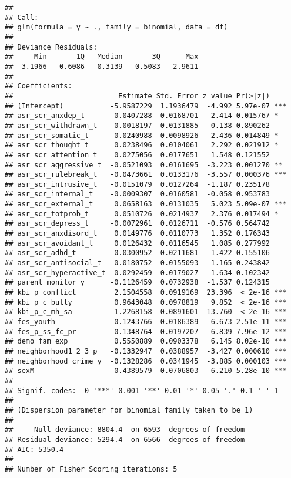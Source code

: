 \documentclass[
]{article}
\begin{document}
\begin{verbatim}
## 
## Call:
## glm(formula = y ~ ., family = binomial, data = df)
## 
## Deviance Residuals: 
##     Min       1Q   Median       3Q      Max  
## -3.1966  -0.6086  -0.3139   0.5083   2.9611  
## 
## Coefficients:
##                         Estimate Std. Error z value Pr(>|z|)    
## (Intercept)           -5.9587229  1.1936479  -4.992 5.97e-07 ***
## asr_scr_anxdep_t      -0.0407288  0.0168701  -2.414 0.015767 *  
## asr_scr_withdrawn_t    0.0018197  0.0131885   0.138 0.890262    
## asr_scr_somatic_t      0.0240988  0.0098926   2.436 0.014849 *  
## asr_scr_thought_t      0.0238496  0.0104061   2.292 0.021912 *  
## asr_scr_attention_t    0.0275056  0.0177651   1.548 0.121552    
## asr_scr_aggressive_t  -0.0521093  0.0161695  -3.223 0.001270 ** 
## asr_scr_rulebreak_t   -0.0473661  0.0133176  -3.557 0.000376 ***
## asr_scr_intrusive_t   -0.0151079  0.0127264  -1.187 0.235178    
## asr_scr_internal_t    -0.0009307  0.0160581  -0.058 0.953783    
## asr_scr_external_t     0.0658163  0.0131035   5.023 5.09e-07 ***
## asr_scr_totprob_t      0.0510726  0.0214937   2.376 0.017494 *  
## asr_scr_depress_t     -0.0072961  0.0126711  -0.576 0.564742    
## asr_scr_anxdisord_t    0.0149776  0.0110773   1.352 0.176343    
## asr_scr_avoidant_t     0.0126432  0.0116545   1.085 0.277992    
## asr_scr_adhd_t        -0.0300952  0.0211681  -1.422 0.155106    
## asr_scr_antisocial_t   0.0180752  0.0155093   1.165 0.243842    
## asr_scr_hyperactive_t  0.0292459  0.0179027   1.634 0.102342    
## parent_monitor_y      -0.1126459  0.0732938  -1.537 0.124315    
## kbi_p_conflict         2.1504558  0.0919169  23.396  < 2e-16 ***
## kbi_p_c_bully          0.9643048  0.0978819   9.852  < 2e-16 ***
## kbi_p_c_mh_sa          1.2268158  0.0891601  13.760  < 2e-16 ***
## fes_youth              0.1243766  0.0186389   6.673 2.51e-11 ***
## fes_p_ss_fc_pr         0.1348764  0.0197207   6.839 7.96e-12 ***
## demo_fam_exp           0.5550889  0.0903378   6.145 8.02e-10 ***
## neighborhood1_2_3_p   -0.1332947  0.0388957  -3.427 0.000610 ***
## neighborhood_crime_y  -0.1328286  0.0341945  -3.885 0.000103 ***
## sexM                   0.4389579  0.0706803   6.210 5.28e-10 ***
## ---
## Signif. codes:  0 '***' 0.001 '**' 0.01 '*' 0.05 '.' 0.1 ' ' 1
## 
## (Dispersion parameter for binomial family taken to be 1)
## 
##     Null deviance: 8804.4  on 6593  degrees of freedom
## Residual deviance: 5294.4  on 6566  degrees of freedom
## AIC: 5350.4
## 
## Number of Fisher Scoring iterations: 5
\end{verbatim}
\end{document}
